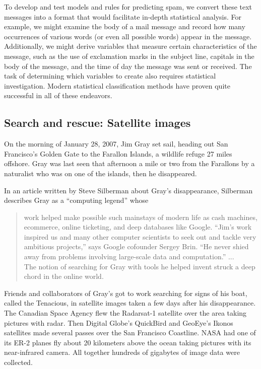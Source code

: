 To develop and test models and rules for predicting spam, we convert
these text messages into a format that would facilitate in-depth
statistical analysis.  For example, we might examine the body of a
mail message and record how many occurrences of various words (or even
all possible words) appear in the message.  Additionally, we might
derive variables that measure certain characteristics of the message,
such as the use of exclamation marks in the subject line, capitals in
the body of the message, and the time of day the message was sent or
received.  The task of determining which variables to create also
requires statistical investigation.  Modern statistical classification
methods have proven quite successful in all of these endeavors.

\subsection{Search and rescue: Satellite images}
On the morning of January 28, 2007, Jim Gray set sail, heading out San
Francisco's Golden Gate to the Farallon Islands, a wildlife refuge 27
miles offshore. Gray was last seen that afternoon a mile or two from
the Farallons by a naturalist who was on one of the islands, then he
disappeared.

In an article written by Steve Silberman about Gray's disappearance,
Silberman describes Gray as a ``computing legend'' whose
\begin{quote}
  work helped make possible such mainstays of modern life as cash
  machines, ecommerce, online ticketing, and deep databases like
  Google.  ``Jim's work inspired us and many other computer scientists
  to seek out and tackle very ambitious projects,'' says Google
  cofounder Sergey Brin. ``He never shied away from problems involving
  large-scale data and computation.''
  ...\\
  The notion of searching for Gray with tools he helped invent struck
  a deep chord in the online world.
\end{quote}

Friends and collaborators of Gray's got to work searching for signs of
his boat, called the Tenacious, in satellite images taken a few days
after his disappearance.  The Canadian Space Agency flew the
Radarsat-1 satellite over the area taking pictures with radar.  Then
Digital Globe's QuickBird and GeoEye's Ikonos satellites made several
passes over the San Francisco Coastline.  NASA had one of its ER-2
planes fly about 20 kilometers above the ocean taking pictures with
its near-infrared camera.  All together hundreds of gigabytes of image
data were collected.

